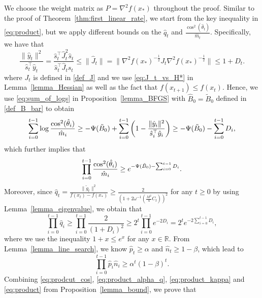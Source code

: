 \documentclass[11pt,letterpaper]{article}
\newcommand\0{{\Vector{0}}}
\newcommand\1{{\Vector{1}}}
\numberwithin{assumption}{section}
\numberwithin{definition}{section}
\numberwithin{theorem}{section}
\numberwithin{remark}{section}
\begin{document}
    We choose the weight matrix as $P = \nabla^2 f(x_*)$ throughout the proof. Similar to the proof of Theorem~\ref{thm:first_linear_rate}, we start from the key inequality in \eqref{eq:product}, but we apply different bounds on the $\hat{q}_t$ and $\frac{\cos^2(\hat{\theta}_t)}{\hat{m}_t}$. Specifically, we have that
    \begin{equation}
        \frac{\|\hat{y}_t\|^2}{\hat{s}_t^\top \hat{y}_t} = \frac{\hat{s}_t^\top \hat{J}_t^2 \hat{s}_t}{\hat{s}_t^\top \hat{J}_t \hat{s}_t} \leq \|\hat{J}_t\| = \|\nabla^2{f(x_*)}^{-\frac{1}{2}}J_t \nabla^2{f(x_*)}^{-\frac{1}{2}}\| \leq 1 + D_t.
    \end{equation}
    where $J_t$ is defined in \eqref{def_J} and we use \eqref{eq:J_t_vs_H*} in Lemma~\ref{lemma_Hessian} as well as the fact that $f(x_{t + 1}) \leq f(x_t)$. Hence, we use \eqref{eq:sum_of_logs} in Proposition~\ref{lemma_BFGS} with $\hat{B}_0 = \tilde{B}_0$ defined in \eqref{def_B_bar} to obtain
    \begin{equation*}
        \sum_{i = 0}^{t - 1} \log{\frac{\cos^2(\hat{\theta}_i)}{\hat{m}_i}} \geq  - \Psi(\Tilde{B}_{0}) + \sum_{i = 0}^{t - 1}\left(1-\frac{\|\hat{y}_i\|^2}{\hat{s}_i^\top \hat{y}_i} \right) \geq - \Psi(\Tilde{B}_{0}) - \sum_{i = 0}^{t - 1}D_i,
    \end{equation*}
    which further implies that
    \begin{equation}\label{eq:prodcut_cos}
        \prod_{i = 0}^{t - 1} \frac{\cos^2(\hat{\theta}_i)}{\hat{m}_i} \geq e^{- \Psi(\Tilde{B}_{0}) - \sum_{i = 0}^{t - 1}D_i}.
    \end{equation}
    Moreover, since $\hat{q}_t = \frac{\|\tilde{g}_t\|^2}{f(x_t) - f(x_*)} \geq \frac{2}{(1 + 2\omega^{-1}(\frac{M^2}{4}C_t))^2}$ for any $t\geq 0$ by using Lemma~\ref{lemma_eigenvalue}, we obtain that
    \begin{equation}\label{eq:product_alpha_q}
        \prod_{i = 0}^{t - 1} \hat{q}_i \geq \prod_{i = 0}^{t - 1} \frac{2}{(1 + D_i)^2} \geq 2^t\prod_{i = 0}^{t - 1} e^{-2D_i} = 2^te^{-2\sum_{i = 0}^{t - 1}D_i},
    \end{equation}
    where we use the inequality $1+x \leq e^x$ for any $x \in \mathbb{R}$. From Lemma~\ref{lemma_line_search}, we know $\hat{p}_t \geq \alpha$ and $\hat{n}_t\geq 1 - \beta$, which lead to
    \begin{equation}\label{eq:product_kappa}
        \prod_{i = 0}^{t - 1} \hat{p}_i\hat{n}_i \geq \alpha^{t} (1 - \beta)^{t}.
    \end{equation}
    Combining \eqref{eq:prodcut_cos}, \eqref{eq:product_alpha_q}, \eqref{eq:product_kappa} and \eqref{eq:product} from Proposition~\ref{lemma_bound}, we prove that
\end{document}
